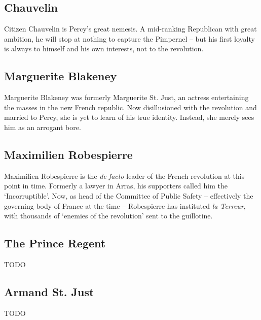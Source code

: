 \subsection*{Chauvelin}

Citizen Chauvelin is Percy's great nemesis. A mid-ranking Republican with great ambition, he will stop at nothing to capture the Pimpernel -- but his first loyalty is always to himself and his own interests, not to the revolution.

\subsection*{Marguerite Blakeney}

Marguerite Blakeney was formerly Marguerite St. Just, an actress entertaining the masses in the new French republic. Now disillusioned with the revolution and married to Percy, she is yet to learn of his true identity. Instead, she merely sees him as an arrogant bore.

\subsection*{Maximilien Robespierre}

Maximilien Robespierre is the \emph{de facto} leader of the French revolution at this point in time. Formerly a lawyer in Arras, his supporters called him the `Incorruptible'. Now, as head of the Committee of Public Safety -- effectively the governing body of France at the time -- Robespierre has instituted \emph{la Terreur}, with thousands of `enemies of the revolution' sent to the guillotine.

\subsection*{The Prince Regent}

TODO

\subsection*{Armand St. Just}

TODO
